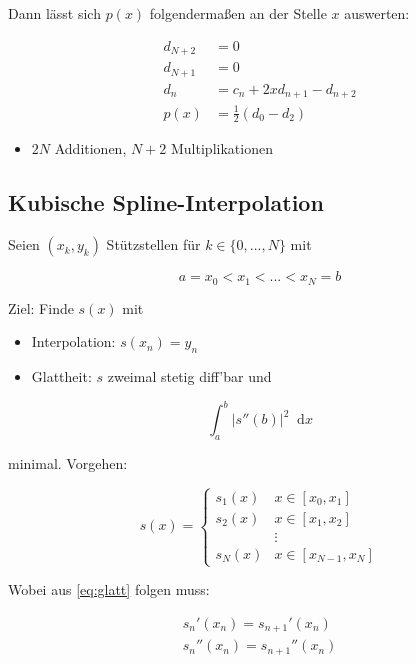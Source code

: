 \documentclass[a4paper, 14pt]{article}
\newcommand*\diff{\mathop{}\!\mathrm{d}}
\begin{document}
	Dann lässt sich $p(x)$ folgendermaßen an der Stelle $x$ auswerten:

	\begin{align}
		d_{N + 2} & = 0 \\
		d_{N + 1} & = 0 \\
		d_n       & = c_n + 2xd_{n + 1} - d_{n + 2} \\
		p(x)      & = \frac{1}{2} (d_0 - d_2)
	\end{align}

	\begin{itemize}
		\item $2N$ Additionen, $N + 2$ Multiplikationen
	\end{itemize}

	\subsection{Kubische Spline-Interpolation}

	Seien $(x_k, y_k)$ Stützstellen für $k \in \{ 0, ..., N \}$ mit

	\begin{equation}
		a = x_0 < x_1 < ... < x_N = b
	\end{equation}

	Ziel: Finde $s(x)$ mit

	\begin{itemize}
		\item Interpolation: $s(x_n) = y_n$
		\item Glattheit: $s$ zweimal stetig diff'bar und
	\end{itemize}

	\begin{equation} \label{eq:glatt}
		\int_a^b{|s''(b)|^2 \diff x}
	\end{equation}

	minimal.
	Vorgehen:

	\begin{equation}
		s(x) = \begin{cases}
			s_1(x) & x \in [x_0, x_1] \\
			s_2(x) & x \in [x_1, x_2] \\
			& \vdots \\
			s_N(x) & x \in [x_{N-1}, x_N]
		\end{cases}
	\end{equation}

	Wobei aus \ref{eq:glatt} folgen muss:

	\begin{align}
		s_n'(x_n) = s_{n + 1}'(x_n) \\
		s_n''(x_n) = s_{n + 1}''(x_n)
	\end{align}
\end{document}
